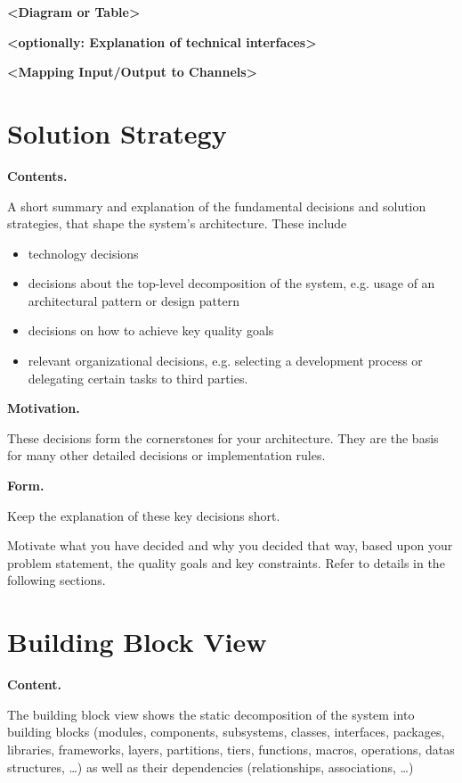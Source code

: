 \documentclass[]{article}
\begin{document}
\textbf{\textless{}Diagram or Table\textgreater{}}

\textbf{\textless{}optionally: Explanation of technical
interfaces\textgreater{}}

\textbf{\textless{}Mapping Input/Output to Channels\textgreater{}}

\hypertarget{section-solution-strategy}{%
\section{Solution Strategy}\label{section-solution-strategy}}

\textbf{Contents.}

A short summary and explanation of the fundamental decisions and
solution strategies, that shape the system's architecture. These include

\begin{itemize}
\item
  technology decisions
\item
  decisions about the top-level decomposition of the system, e.g. usage
  of an architectural pattern or design pattern
\item
  decisions on how to achieve key quality goals
\item
  relevant organizational decisions, e.g. selecting a development
  process or delegating certain tasks to third parties.
\end{itemize}

\textbf{Motivation.}

These decisions form the cornerstones for your architecture. They are
the basis for many other detailed decisions or implementation rules.

\textbf{Form.}

Keep the explanation of these key decisions short.

Motivate what you have decided and why you decided that way, based upon
your problem statement, the quality goals and key constraints. Refer to
details in the following sections.

\hypertarget{section-building-block-view}{%
\section{Building Block View}\label{section-building-block-view}}

\textbf{Content.}

The building block view shows the static decomposition of the system
into building blocks (modules, components, subsystems, classes,
interfaces, packages, libraries, frameworks, layers, partitions, tiers,
functions, macros, operations, datas structures, \ldots{}) as well as
their dependencies (relationships, associations, \ldots{})
\end{document}
